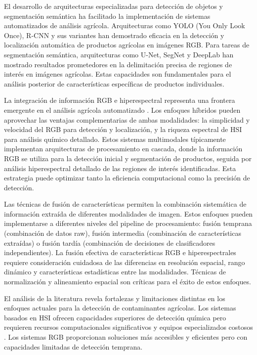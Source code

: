 El desarrollo de arquitecturas especializadas para detección de objetos y segmentación semántica ha facilitado la implementación de sistemas automatizados de análisis agrícola. Arquitecturas como YOLO (You Only Look Once), R-CNN y sus variantes han demostrado eficacia en la detección y localización automática de productos agrícolas en imágenes RGB. Para tareas de segmentación semántica, arquitecturas como U-Net, SegNet y DeepLab han mostrado resultados prometedores en la delimitación precisa de regiones de interés en imágenes agrícolas. Estas capacidades son fundamentales para el análisis posterior de características específicas de productos individuales.

\vspace{5mm}

La integración de información RGB e hiperespectral representa una frontera emergente en el análisis agrícola automatizado \cite{jimaging5050052}. Los enfoques híbridos pueden aprovechar las ventajas complementarias de ambas modalidades: la simplicidad y velocidad del RGB para detección y localización, y la riqueza espectral de HSI para análisis químico detallado. Estos sistemas multimodales típicamente implementan arquitecturas de procesamiento en cascada, donde la información RGB se utiliza para la detección inicial y segmentación de productos, seguida por análisis hiperespectral detallado de las regiones de interés identificadas. Esta estrategia puede optimizar tanto la eficiencia computacional como la precisión de detección.

\vspace{5mm}

Las técnicas de fusión de características permiten la combinación sistemática de información extraída de diferentes modalidades de imagen. Estos enfoques pueden implementarse a diferentes niveles del pipeline de procesamiento: fusión temprana (combinación de datos raw), fusión intermedia (combinación de características extraídas) o fusión tardía (combinación de decisiones de clasificadores independientes). La fusión efectiva de características RGB e hiperespectrales requiere consideración cuidadosa de las diferencias en resolución espacial, rango dinámico y características estadísticas entre las modalidades. Técnicas de normalización y alineamiento espacial son críticas para el éxito de estos enfoques.

\vspace{5mm}

El análisis de la literatura revela fortalezas y limitaciones distintas en los enfoques actuales para la detección de contaminantes agrícolas. Los sistemas basados en HSI ofrecen capacidades superiores de detección química pero requieren recursos computacionales significativos y equipos especializados costosos \cite{KHAN2022101678}. Los sistemas RGB proporcionan soluciones más accesibles y eficientes pero con capacidades limitadas de detección temprana.

